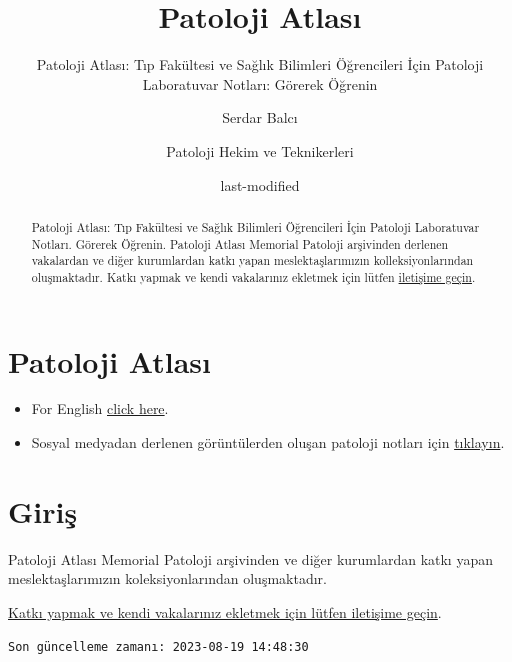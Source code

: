 \documentclass[
  letterpaper,
  DIV=11,
  numbers=noendperiod]{scrreprt}
\title{Patoloji Atlası}
\subtitle{Patoloji Atlası: Tıp Fakültesi ve Sağlık Bilimleri Öğrencileri
İçin Patoloji Laboratuvar Notları: Görerek Öğrenin}
\author{Serdar Balcı \and Patoloji Hekim ve Teknikerleri}
\date{last-modified}
\renewcommand*\contentsname{Içindekiler}
\newcommand\contentsname{Içindekiler}
\begin{document}
\maketitle
\begin{abstract}
Patoloji Atlası: Tıp Fakültesi ve Sağlık Bilimleri Öğrencileri İçin
Patoloji Laboratuvar Notları. Görerek Öğrenin. Patoloji Atlası Memorial
Patoloji arşivinden derlenen vakalardan ve diğer kurumlardan katkı yapan
meslektaşlarımızın kolleksiyonlarından oluşmaktadır. Katkı yapmak ve
kendi vakalarınız ekletmek için lütfen
\href{https://www.patolojiatlasi.com/katki.html}{iletişime geçin}.
\end{abstract}
\renewcommand*\contentsname{İçindekiler}
{
\hypersetup{linkcolor=}
\setcounter{tocdepth}{1}
\tableofcontents
}

\hypertarget{sec-patoloji-atlasi}{%
\chapter*{Patoloji Atlası}\label{sec-patoloji-atlasi}}


\begin{itemize}
\item
  For English \href{https://www.histopathologyatlas.com/}{click here}.
\item
  Sosyal medyadan derlenen görüntülerden oluşan patoloji notları için
  \href{https://www.patolojinotlari.com/}{tıklayın}.\\
\end{itemize}


\hypertarget{sec-giris}{%
\chapter*{Giriş}\label{sec-giris}}


Patoloji Atlası Memorial Patoloji arşivinden ve diğer kurumlardan katkı
yapan meslektaşlarımızın koleksiyonlarından oluşmaktadır.

\href{https://www.patolojiatlasi.com/katki.html}{Katkı yapmak ve kendi
vakalarınız ekletmek için lütfen iletişime geçin}.

\begin{verbatim}
Son güncelleme zamanı: 2023-08-19 14:48:30
\end{verbatim}
\end{document}
